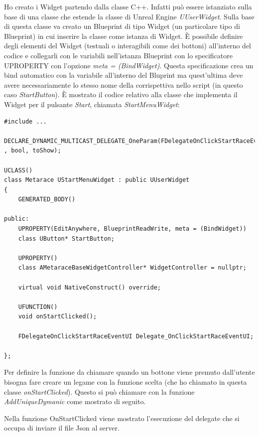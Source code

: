     Ho creato i Widget partendo dalla classe C++.
    Infatti può essere istanziato sulla base di una classe che estende la classe di Unreal Engine \textit{UUserWidget}.
    Sulla base di questa classe va creato un Blueprint di tipo Widget (un particolare tipo di Blueprint) in cui inserire la classe come istanza di Widget. 
    È possibile definire degli elementi del Widget (testuali o interagibili come dei bottoni) all'interno del codice e collegarli con le variabili nell'istanza Blueprint con lo specificatore UPROPERTY con l'opzione \textit{meta = (BindWidget)}.
    Questa specificazione crea un bind automatico con la variabile all'interno del Bluprint ma quest'ultima deve avere necessariamente lo stesso nome della corrispettiva nello script (in questo caso \textit{StartButton}).
    È mostrato il codice relativo alla classe che implementa il Widget per il pulsante \textit{Start}, chiamata \textit{StartMenuWidget}:

    \begin{lstlisting}[caption = File header della classe StartMenuWidget]
#include ...

DECLARE_DYNAMIC_MULTICAST_DELEGATE_OneParam(FDelegateOnClickStartRaceEventUI , bool, toShow);

UCLASS()
class Metarace UStartMenuWidget : public UUserWidget
{
	GENERATED_BODY()
	
public:
	UPROPERTY(EditAnywhere, BlueprintReadWrite, meta = (BindWidget))
	class UButton* StartButton;

	UPROPERTY()
	class AMetaraceBaseWidgetController* WidgetController = nullptr;

	virtual void NativeConstruct() override;

	UFUNCTION()
	void onStartClicked();

	FDelegateOnClickStartRaceEventUI Delegate_OnClickStartRaceEventUI;
	
};
    \end{lstlisting}

    Per definire la funzione da chiamare quando un bottone viene premuto dall'utente bisogna fare creare un legame con la funzione scelta (che ho chiamato in questa classe \textit{onStartClicked}).
    Questo si può chiamare con la funzione \textit{AddUniqueDymanic} come mostrato di seguito.

    Nella funzione OnStartClicked viene mostrato l'esecuzione del delegate che si occupa di inviare il file Json al server. 

